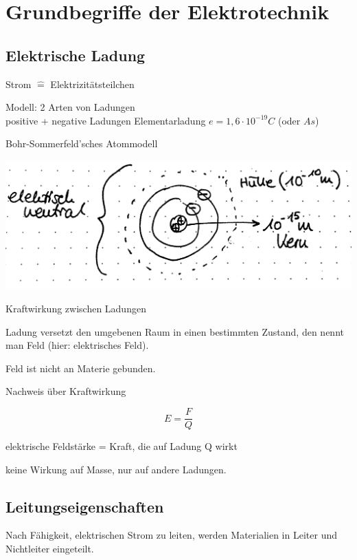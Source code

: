\section{Grundbegriffe der Elektrotechnik}
\subsection{Elektrische Ladung}

Strom $\hat{=}$ \glqq Elektrizitätsteilchen\grqq

\Ra Modell: 2 Arten von Ladungen\\
\ra positive + negative Ladungen \ra Elementarladung $e = 1,6 \cdot 10^{-19}C$ (oder $As$)

\Ra Bohr-Sommerfeld'sches Atommodell

\includegraphics[width=\textwidth]{img/1_4}

Kraftwirkung zwischen Ladungen

Ladung versetzt den umgebenen Raum in einen bestimmten Zustand, den nennt man Feld (hier: elektrisches Feld).

Feld ist nicht an Materie gebunden.

Nachweis über Kraftwirkung

$$E = \frac{F}{Q}$$

elektrische Feldstärke = Kraft, die auf Ladung Q wirkt

keine Wirkung auf Masse, nur auf andere Ladungen.

\subsection{Leitungseigenschaften}

Nach Fähigkeit, elektrischen Strom zu leiten, werden Materialien in Leiter und Nichtleiter eingeteilt.

